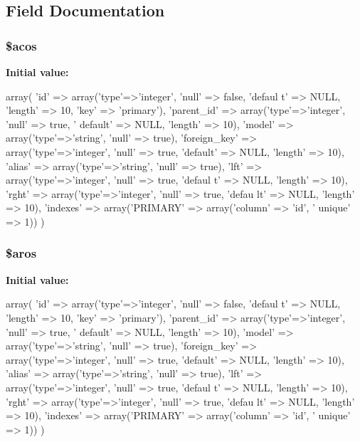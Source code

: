 \subsection{Field Documentation}
\hypertarget{class_db_acl_schema_a422728e97547c25d5c36a37a736eaf3c}{
\subsubsection[{\$acos}]{\setlength{\rightskip}{0pt plus 5cm}\$acos}}
\label{class_db_acl_schema_a422728e97547c25d5c36a37a736eaf3c}
{\bfseries Initial value:}
\begin{DoxyCode}
 array(
                        'id' => array('type'=>'integer', 'null' => false, 'defaul
      t' => NULL, 'length' => 10, 'key' => 'primary'),
                        'parent_id' => array('type'=>'integer', 'null' => true, '
      default' => NULL, 'length' => 10),
                        'model' => array('type'=>'string', 'null' => true),
                        'foreign_key' => array('type'=>'integer', 'null' => true,
       'default' => NULL, 'length' => 10),
                        'alias' => array('type'=>'string', 'null' => true),
                        'lft' => array('type'=>'integer', 'null' => true, 'defaul
      t' => NULL, 'length' => 10),
                        'rght' => array('type'=>'integer', 'null' => true, 'defau
      lt' => NULL, 'length' => 10),
                        'indexes' => array('PRIMARY' => array('column' => 'id', '
      unique' => 1))
                )
\end{DoxyCode}
\hypertarget{class_db_acl_schema_aa6897cad82be8e7b7727ceb6d40b1f2e}{
\subsubsection[{\$aros}]{\setlength{\rightskip}{0pt plus 5cm}\$aros}}
\label{class_db_acl_schema_aa6897cad82be8e7b7727ceb6d40b1f2e}
{\bfseries Initial value:}
\begin{DoxyCode}
 array(
                        'id' => array('type'=>'integer', 'null' => false, 'defaul
      t' => NULL, 'length' => 10, 'key' => 'primary'),
                        'parent_id' => array('type'=>'integer', 'null' => true, '
      default' => NULL, 'length' => 10),
                        'model' => array('type'=>'string', 'null' => true),
                        'foreign_key' => array('type'=>'integer', 'null' => true,
       'default' => NULL, 'length' => 10),
                        'alias' => array('type'=>'string', 'null' => true),
                        'lft' => array('type'=>'integer', 'null' => true, 'defaul
      t' => NULL, 'length' => 10),
                        'rght' => array('type'=>'integer', 'null' => true, 'defau
      lt' => NULL, 'length' => 10),
                        'indexes' => array('PRIMARY' => array('column' => 'id', '
      unique' => 1))
                )
\end{DoxyCode}
